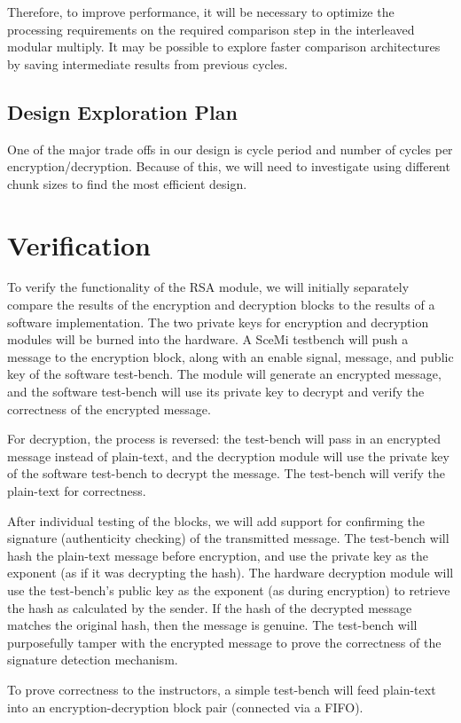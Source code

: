 \documentclass[12pt]{article}
\begin{document}
Therefore, to improve performance, it will be necessary to optimize the
processing requirements on the required comparison step in the interleaved
modular multiply. It may be possible to explore faster comparison
architectures by saving intermediate results from previous cycles.
\subsection{Design Exploration Plan}
One of the major trade offs in our design is cycle period and number of cycles per encryption/decryption. Because of this, we will need to investigate using different chunk sizes to find the most efficient design. 

\section{Verification}
To verify the functionality of the RSA module, we will initially separately 
compare the results of the encryption and decryption blocks to the results
of a software implementation. The two private keys for encryption and
decryption modules will be burned into the hardware. A SceMi testbench will
push a message to the encryption block, along with an enable signal, message,
and public key of the software test-bench. The module will generate an encrypted message,
and the software test-bench will use its private key to decrypt and verify the 
correctness of the encrypted message.

For decryption, the process is reversed: the test-bench will pass in an 
encrypted message instead of plain-text, and the decryption module will use
the private key of the software test-bench to decrypt the message. The test-bench
will verify the plain-text for correctness.

After individual testing of the blocks, we will add support for confirming the signature
(authenticity checking) of the transmitted message. The test-bench will hash the plain-text
message before encryption, and use the private key as the exponent (as if it was decrypting
the hash). The hardware decryption module will use the test-bench's public key as the exponent
(as during encryption) to retrieve the hash as calculated by the sender. If the hash of the
decrypted message matches the original hash, then the message is genuine. The test-bench
will purposefully tamper with the encrypted message to prove the correctness of the 
signature detection mechanism. 

To prove correctness to the instructors, a simple test-bench will feed plain-text into an
encryption-decryption block pair (connected via a FIFO).
\end{document}
